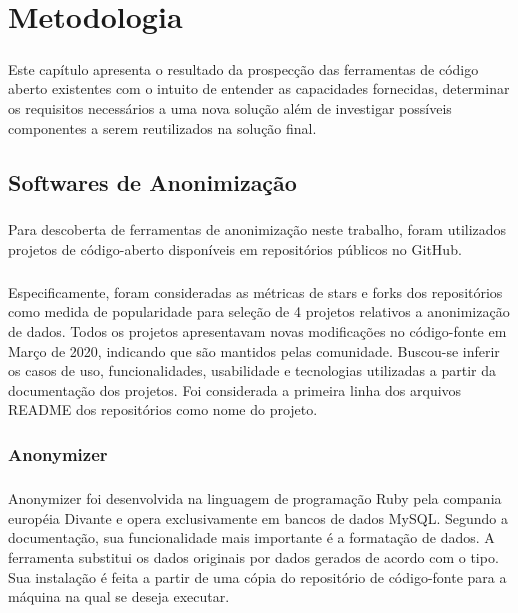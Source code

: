 \chapter{Metodologia}
\label{cap3}

\paragraph{} Este capítulo apresenta o resultado da prospecção das ferramentas de código aberto existentes com o intuito de entender as capacidades fornecidas, determinar os requisitos necessários a uma nova solução além de investigar possíveis componentes a serem reutilizados na solução final.

\section{Softwares de Anonimização}

\paragraph{} Para descoberta de ferramentas de anonimização neste trabalho, foram utilizados projetos de código-aberto disponíveis em repositórios públicos no GitHub. 

\paragraph{} Especificamente, foram consideradas as métricas de stars e forks dos repositórios como medida de popularidade para seleção de 4 projetos relativos a anonimização de dados. Todos os projetos apresentavam novas modificações no código-fonte em Março de 2020, indicando que são mantidos pelas comunidade. Buscou-se inferir os casos de uso, funcionalidades, usabilidade e tecnologias utilizadas a partir da documentação dos projetos. Foi considerada a primeira linha dos arquivos README dos repositórios como nome do projeto.

\subsection{Anonymizer}

\paragraph{} Anonymizer\cite{Anonymizer} foi desenvolvida na linguagem de programação Ruby pela compania européia Divante e opera exclusivamente em bancos de dados MySQL. Segundo a documentação, sua funcionalidade mais importante é a formatação de dados. A ferramenta substitui os dados originais por dados gerados de acordo com o tipo. Sua instalação é feita a partir de uma cópia do repositório de código-fonte para a máquina na qual se deseja executar.

